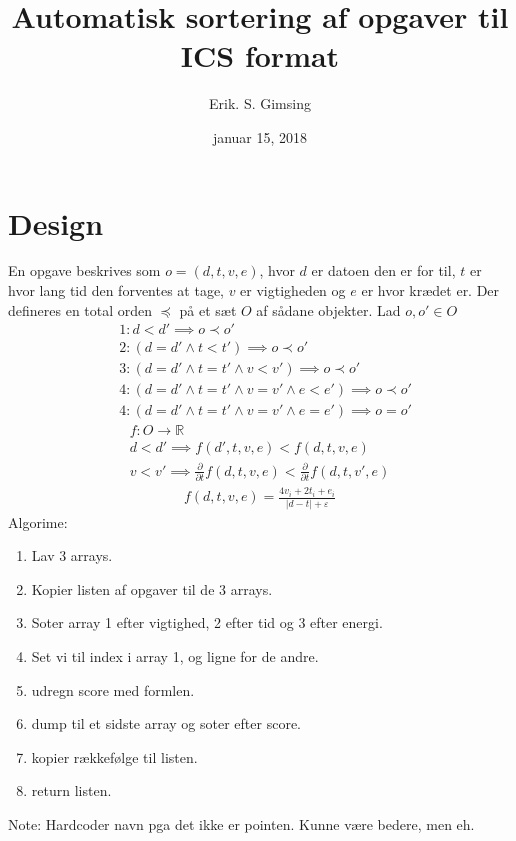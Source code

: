 \documentclass{article}
\title{Automatisk sortering af opgaver til ICS format}
\author{Erik. S. Gimsing}
\date{januar 15, 2018}
\begin{document}
\maketitle
\section{Design}
En opgave beskrives som $o = (d,t,v,e)$, hvor $d$ er datoen den er for til, $t$
er hvor lang tid den forventes at tage, $v$ er vigtigheden og $e$ er hvor
kr{\ae}det er. Der defineres en total orden $\preceq$ p{\aa} et s{\ae}t $O$ af
s{\aa}dane objekter. Lad $o,o' \in O$
\begin{align*}
	&1:d < d' \implies o \prec o' \\
	&2:(d = d' \land t < t') \implies o \prec o' \\
	&3:(d = d' \land t = t' \land v < v') \implies o \prec o' \\
	&4:(d = d' \land t = t' \land v = v' \land e < e') \implies o \prec o' \\
	&4:(d = d' \land t = t' \land v = v' \land e = e') \implies o = o'
\end{align*}
\begin{align*}
	f: O \rightarrow \mathbb{R} \\
	d < d' \implies f(d',t,v,e) < f(d,t,v,e) \\
	v < v' \implies \frac{\partial}{\partial t} f(d,t,v,e) <
	\frac{\partial}{\partial t} f(d,t,v',e)
\end{align*}
\begin{align*}
	f(d,t,v,e) = \frac{4v_i+2t_i+e_i}{|d-t|+\varepsilon}
\end{align*}
Algorime:
\begin{enumerate}
	\item Lav 3 arrays.
	\item Kopier listen af opgaver til de 3 arrays.
	\item Soter array 1 efter vigtighed, 2 efter tid og 3 efter energi.
	\item Set vi til index i array 1, og ligne for de andre.
	\item udregn score med formlen.
	\item dump til et sidste array og soter efter score.
	\item kopier r{\ae}kkef{\o}lge til listen.
	\item return listen.
\end{enumerate}
Note: Hardcoder navn pga det ikke er pointen. Kunne v{\ae}re bedere, men eh.
\end{document}
